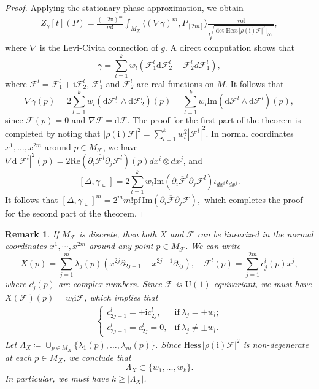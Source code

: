 \documentclass[12pt]{amsart}
\numberwithin{table}{section}
\numberwithin{equation}{section}
\newtheorem{rmk}{Remark}[section]
\theoremstyle{plain}
\newcommand{\U}{\mathrm{U}}
\newcommand{\sF}{\mathcal{F}}
\newcommand{\pf}{\mathrm{pf}\,}
\newcommand{\Hess}{\mathrm{Hess}\,}
\newcommand{\vol}{\mathrm{vol}}
\begin{document}
\begin{proof}
	Applying the stationary phase approximation, we obtain
	\begin{align*}
		Z_{\gamma}[t](P)  = \frac{(-2\pi)^m}{m!} \int_{M_X} \langle (\nabla \gamma)^m, P_{[2m]} \rangle \frac{\vol}{\sqrt{\det \Hess |\dot{\rho}(\mathrm{i}) \sF|^2|_{N_X}}},
	\end{align*}
	where $\nabla$ is the Levi-Civita connection of $g$. A direct computation shows that
	\[
	\gamma = \sum_{l=1}^k w_l(\sF^l_1 \mathrm{d} \sF^l_2 - \sF^l_2 d\sF^l_1),
	\]
	where $\sF^l = \sF^l_1 + \mathrm{i} \sF^l_2$, $\sF^l_1$ and $\sF^l_2$ are real functions on $M$. It follows that
	\[
	\nabla \gamma(p) = 2\sum_{l=1}^k w_l ( \mathrm{d} \sF^l_1 \wedge \mathrm{d} \sF^l_2)(p) = \sum_{l=1}^k w_l \mathrm{Im}(\mathrm{d}\overline{\sF^l} \wedge \mathrm{d} \sF^l)(p),
	\]
	since $\sF(p)=0$ and $\nabla \sF = \mathrm{d} \sF$. The proof for the first part of the theorem is completed by noting that $|\dot{\rho}(\mathrm{i}) \sF|^2 = \sum_{l=1}^kw_l^2|\sF^l|^2$.
	In normal coordinates $x^1,\dots, x^{2m}$ around $p \in M_{\sF}$, we have $\nabla \mathrm{d} |\sF^l|^2(p) = 2 \mathrm{Re}(\partial_i \overline{\sF^l} \partial_j \sF^l)(p) dx^i \otimes dx^j$, and
	\[
	[\Delta, \gamma \llcorner] 
	= 2 \sum_{l=1}^k w_l \mathrm{Im}(\partial_i \overline{\sF}^l \partial_j \sF^l)  \iota_{dx^i} \iota_{dx^j}.
	\]
	It follows that
	$
	[\Delta, \gamma \llcorner]^m %
	= 2^m m! \pf \mathrm{Im}(\partial_i \overline{\sF} \partial_j \sF),
	$
	which completes the proof for the second part of the theorem.
\end{proof}

\begin{rmk}
	If $M_{\sF}$ is discrete, then both $X$ and $\sF$ can be linearized in the normal coordinates $x^1, \cdots, x^{2m}$ around any point $p \in M_{\sF}$. We can write
	\[
	X(p) = \sum_{j=1}^{m}\lambda_j(p)(x^{2j}\partial_{2j-1}-x^{2j-1}\partial_{2j}), \quad \sF^l(p) = \sum_{j=1}^{2m}c^l_{j}(p)x^{j},
	\]
	where $c^l_j(p)$ are complex numbers. Since $\sF$ is $\U(1)$-equivariant, we must have $X(\sF)(p) = w_l \mathrm{i} \sF$, which implies that
	\begin{align*}
		\begin{cases}
			c_{2j-1}^l = \pm \mathrm{i} c^l_{2j}, & \text{if}~\lambda_j = \pm w_l; \\
			c_{2j-1}^l = c^l_{2j}=0, & \text{if}~\lambda_j \neq \pm w_l.
		\end{cases}
	\end{align*}
	Let $\Lambda_X\coloneqq\cup_{p \in M_X}\{\lambda_1(p), \dots, \lambda_m(p)\}$. Since $\Hess |\dot{\rho}(\mathrm{i})\sF|^2$ is non-degenerate at each $p \in M_X$, we conclude that
	\[
	\Lambda_X \subset \{w_1, \dots, w_k\}.
	\]
	In particular, we must have $k \geq |\Lambda_X|$.
\end{rmk}
\end{document}
